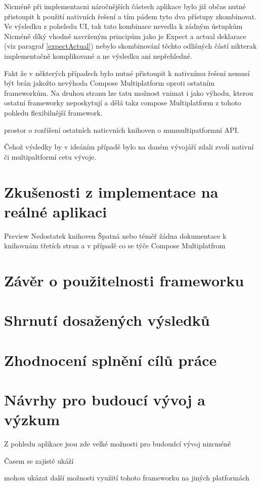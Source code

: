 Nicméně při implementacni náročnějších částech aplikace bylo již občas nutné přistoupit k použití nativních řešení a tím pádem tyto dva přístupy zkombinovat.
Ve výsledku z poheledu UI, tak tato kombinace nevedla k zádným ústupkům
Nicméně díký vhodně navrženým principům jako je Expect a actual deklarace (viz paragraf \ref{expectActual}) nebylo skombinování těchto odlišných částí nikterak
implementačně komplikované a ne výsledku ani nepřehledné. 

Fakt že v některých případech bylo nutné přistoupit k nativnímu řešení nemusí být brán jakožto nevýhoda Compose Multiplatform oproti ostatním frameworkům.
Na druhou stranu lze tatu možnost vnimat i jako výhodu, kterou ostatní frameworky neposkytují a dělá takz compose Multiplatform z tohoto pohledu flexibilnější
framework.

prostor o rozříšení ostatních naticvních knihoven o mmmultipatformní API. 

Čehož výsledky by v ideáním případě bylo na daném vývojáří zdali zvolí nativní či multipaltformí cetu vývoje. 

\section{Zkušenosti z implementace na reálné aplikaci}
Preview
Nedostatek knihoven
Špatná nebo téměř žádna dokumentace k knihovnám třetích stran a v případě co se týče Compose Multiplatfrom
\section{Závěr o použitelnosti frameworku}



\section{Shrnutí dosažených výsledků}
\section{Zhodnocení splnění cílů práce}
\section{Návrhy pro budoucí vývoj a výzkum}
Z pohledu aplikace jsou zde velké možnosti pro budoudcí vývoj nizcméně 


Časem se zajisté ukáží

\bigskip

mohou ukázat další možnosti využití tohoto frameworku na jiných platformách


